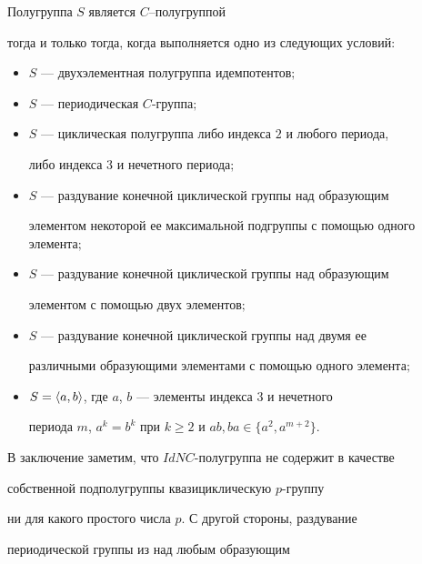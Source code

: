 \begin{prop}


Полугруппа $S$ является $C$--полугруппой


тогда и только тогда, когда выполняется одно из следующих условий$:$


\begin{itemize}


\item[1)] $S$ --- двухэлементная полугруппа идемпотентов$;$


\item[2)] $S$ --- периодическая $C$-группа$;$


\item[3)] $S$ --- циклическая полугруппа либо индекса $2$ и любого периода,


либо индекса $3$ и нечетного периода$;$


\item[4)] $S$ --- раздувание конечной циклической группы над образующим


элементом некоторой ее максимальной подгруппы с помощью одного элемента$;$


\item[5)] $S$ --- раздувание конечной циклической группы над образующим


элементом с помощью двух элементов$;$


\item[6)] $S$ --- раздувание конечной циклической группы над двумя ее


различными образующими элементами с помощью одного элемента$;$


\item[7)] $S=\langle a,b\rangle$, где $a$, $b$ --- элементы индекса $3$ и нечетного


периода $m$, $a^k=b^k$ при $k\ge 2$ и $ab,ba\in \{a^2,a^{m+2}\}$.


\end{itemize}


\end{prop}





В заключение заметим, что $IdNC$-полугруппа не содержит в качестве


собственной подполугруппы квазициклическую $p$-группу


ни для какого простого числа $p$. С другой стороны, раздувание


периодической группы из \cite {5} над любым образующим



